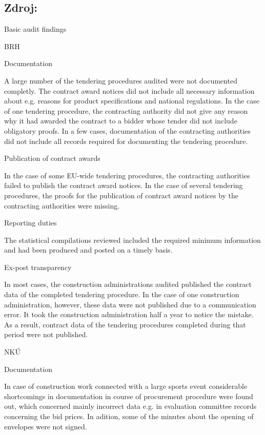 \documentclass[10pt]{article}
\begin{document}
\subsection*{Zdroj:}



Basic audit findings



BRH



Documentation

A large number of the tendering procedures audited were not documented completly.
The contract award notices did not include all necessary information about e.g. reasons for product specifications and national regulations.
In the case of one tendering procedure, the contracting authority did not give any reason why it had awarded the contract to a bidder whose tender did not include obligatory proofs.
In a few cases, documentation of the contracting authorities did not include all records required for documenting the tendering procedure.


Publication of contract awards

In the case of some EU-wide tendering procedures, the contracting authorities failed to publish the contract award notices.
In the case of several tendering procedures, the proofs for the publication of contract award notices by the contracting authorities were missing.


Reporting duties

The statistical compilations reviewed included the required minimum information and had been produced and posted on a timely basis.


Ex-post transparency

In most cases, the construction administrations audited published the contract data of the completed tendering procedure.
In the case of one construction administration, however, these data were not published due to a communication error.
It took the construction administration half a year to notice the mistake.
As a result, contract data of the tendering procedures completed during that period were not published.


NKÚ



Documentation

In case of construction work connected with a large sports event considerable shortcomings in documentation in course of procurement procedure were found out, which concerned mainly incorrect data e.g. in evaluation committee records concerning the bid prices.
In adition, some of the minutes about the opening of envelopes were not signed.
\end{document}
